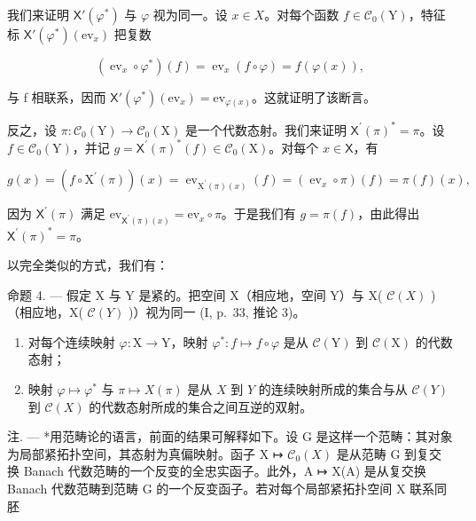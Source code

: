 我们来证明 \(\mathsf{X}'(\varphi^{*})\) 与 \(\varphi\) 视为同一。设 \(x \in X\)。对每个函数 \(f \in \mathcal{C}_{0}(\mathrm{Y})\)，特征标 \(\mathsf{X}'(\varphi^{*})(\mathrm{ev}_{x})\) 把复数

\[
\left(\operatorname{ev} _ {x} \circ \varphi^ {*}\right) (f) = \operatorname{ev} _ {x} (f \circ \varphi) = f (\varphi (x)),
\]

与 f 相联系，因而 \(\mathsf{X}'(\varphi^{*})(\mathrm{ev}_{x}) = \mathrm{ev}_{\varphi(x)}\)。这就证明了该断言。

反之，设 \(\pi\colon\mathcal{C}_{0}(\mathrm{Y})\to\mathcal{C}_{0}(\mathrm{X})\) 是一个代数态射。我们来证明 \(\mathsf{X}^{\prime}(\pi)^{*}=\pi\)。设 \(f\in\mathcal{C}_{0}(\mathrm{Y})\)，并记 \(g=\mathsf{X}^{\prime}(\pi)^{*}(f)\in\mathcal{C}_{0}(\mathrm{X})\)。对每个 \(x\in\mathsf{X}\)，有

\[
g (x) = \left(f \circ \mathrm{X} ^ {\prime} (\pi)\right) (x) = \operatorname{ev} _ {\mathrm{X} ^ {\prime} (\pi) (x)} (f) = \left(\operatorname{ev} _ {x} \circ \pi\right) (f) = \pi (f) (x),
\]

因为 \(\mathsf{X}^{\prime}(\pi)\) 满足 \(\mathrm{ev}_{\mathsf{X}^{\prime}(\pi)(x)} = \mathrm{ev}_{x} \circ \pi\)。于是我们有 \(g = \pi(f)\)，由此得出 \(\mathsf{X}^{\prime}(\pi)^{*} = \pi\)。

以完全类似的方式，我们有：

命题 4. --- 假定 X 与 Y 是紧的。把空间 X（相应地，空间 Y）与 X( \(\mathcal{C}(X)\) )（相应地，X( \(\mathcal{C}(Y)\) )）视为同一 (I, p.~33, 推论 3)。

\begin{enumerate}
\def\labelenumi{\alph{enumi})}
\item
  对每个连续映射 \(\varphi\colon\mathrm{X}\to\mathrm{Y}\)，映射 \(\varphi^{*}\colon f\mapsto f\circ\varphi\) 是从 \(\mathcal{C}(\mathrm{Y})\) 到 \(\mathcal{C}(\mathrm{X})\) 的代数态射；
\item
  映射 \(\varphi \mapsto \varphi^{*}\) 与 \(\pi \mapsto X(\pi)\) 是从 \(X\) 到 \(Y\) 的连续映射所成的集合与从 \(\mathcal{C}(Y)\) 到 \(\mathcal{C}(X)\) 的代数态射所成的集合之间互逆的双射。
\end{enumerate}

注. --- *用范畴论的语言，前面的结果可解释如下。设 G 是这样一个范畴：其对象为局部紧拓扑空间，其态射为真偏映射。函子 X ↦ \(\mathcal{C}_0(X)\) 是从范畴 G 到复交换 Banach 代数范畴的一个反变的全忠实函子。此外，A ↦ X(A) 是从复交换 Banach 代数范畴到范畴 G 的一个反变函子。若对每个局部紧拓扑空间 X 联系同胚

